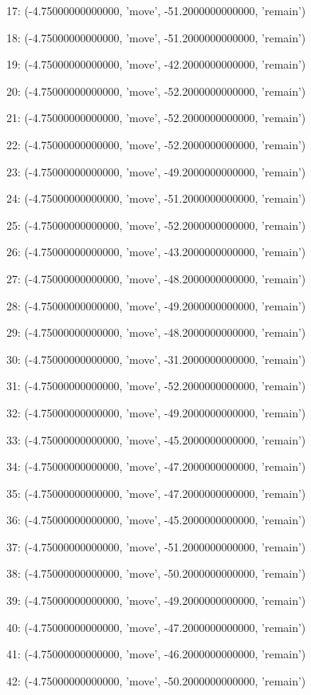 17: (-4.75000000000000, 'move', -51.2000000000000, 'remain')


18: (-4.75000000000000, 'move', -51.2000000000000, 'remain')


19: (-4.75000000000000, 'move', -42.2000000000000, 'remain')


20: (-4.75000000000000, 'move', -52.2000000000000, 'remain')


21: (-4.75000000000000, 'move', -52.2000000000000, 'remain')


22: (-4.75000000000000, 'move', -52.2000000000000, 'remain')


23: (-4.75000000000000, 'move', -49.2000000000000, 'remain')


24: (-4.75000000000000, 'move', -51.2000000000000, 'remain')


25: (-4.75000000000000, 'move', -52.2000000000000, 'remain')


26: (-4.75000000000000, 'move', -43.2000000000000, 'remain')


27: (-4.75000000000000, 'move', -48.2000000000000, 'remain')


28: (-4.75000000000000, 'move', -49.2000000000000, 'remain')


29: (-4.75000000000000, 'move', -48.2000000000000, 'remain')


30: (-4.75000000000000, 'move', -31.2000000000000, 'remain')


31: (-4.75000000000000, 'move', -52.2000000000000, 'remain')


32: (-4.75000000000000, 'move', -49.2000000000000, 'remain')


33: (-4.75000000000000, 'move', -45.2000000000000, 'remain')


34: (-4.75000000000000, 'move', -47.2000000000000, 'remain')


35: (-4.75000000000000, 'move', -47.2000000000000, 'remain')


36: (-4.75000000000000, 'move', -45.2000000000000, 'remain')


37: (-4.75000000000000, 'move', -51.2000000000000, 'remain')


38: (-4.75000000000000, 'move', -50.2000000000000, 'remain')


39: (-4.75000000000000, 'move', -49.2000000000000, 'remain')


40: (-4.75000000000000, 'move', -47.2000000000000, 'remain')


41: (-4.75000000000000, 'move', -46.2000000000000, 'remain')


42: (-4.75000000000000, 'move', -50.2000000000000, 'remain')


